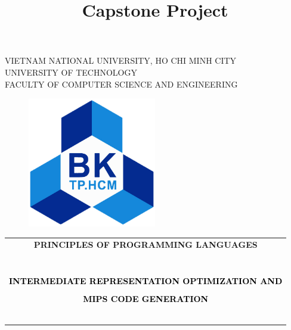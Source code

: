 \documentclass[a4paper]{report}
\author{}
\title{Capstone Project}
\date{}
\begin{document}
\begin{titlepage}
  \begin{center}
    VIETNAM NATIONAL UNIVERSITY, HO CHI MINH CITY\\
    UNIVERSITY OF TECHNOLOGY\\
    FACULTY OF COMPUTER SCIENCE AND ENGINEERING
  \end{center}

  \vspace{1cm}

  \begin{figure}[ht]
    \centering
    \includegraphics[width=0.5\textwidth]{hcmut.png}
  \end{figure}

  \vspace{1cm}

  \begin{center}
    \begin{tabular}{c}
      \multicolumn{1}{c}{\textbf{{\Large \color{blue} PRINCIPLES OF PROGRAMMING LANGUAGES}}} \\ \\
      ~~                                                                                     \\
      \hline
      \\

      \textcolor{black}{\textbf{{\large INTERMEDIATE REPRESENTATION OPTIMIZATION AND}}}      \\\\
      \textcolor{black}{\textbf{{\large MIPS CODE GENERATION}}}                              \\
      ~~                                                                                     \\
      \hline
      \\
    \end{tabular}
  \end{center}


\end{titlepage}
\end{document}
